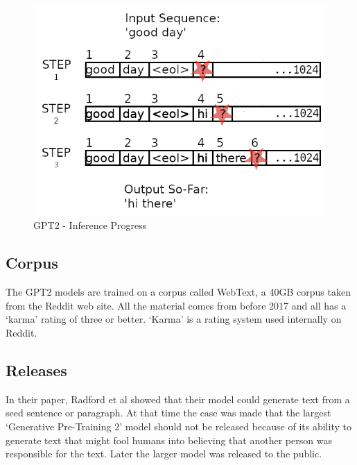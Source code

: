 \begin{figure}[H]
	\begin{center}
		
		
		\includegraphics[scale=2.0]{diagram-inference-02}
	\end{center}
	\caption[Generative Pre-Training 2 Inference]{GPT2 - Inference Progress}
	
	
\end{figure}

\subsection{Corpus}
The GPT2 models are trained on a corpus called WebText, a 40GB corpus taken from the Reddit web site. All the material comes from before 2017 and all has a `karma' rating of three or better. `Karma' is a rating system used internally on Reddit. 


\subsection{Releases}
In their paper, Radford et al \cite{radford2019language} showed that their model could generate text from a seed sentence or paragraph. At that time the case was made that the largest `Generative Pre-Training 2' model should not be released because of its ability to generate text that might fool humans into believing that another person was responsible for the text. Later the larger model was released to the public.

